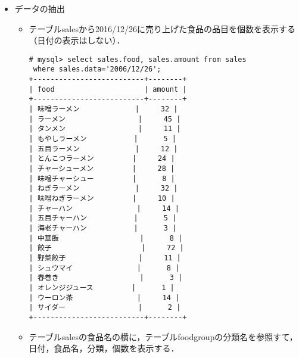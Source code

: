 \documentclass[a4j,titlepage]{jarticle}
\begin{document}
\begin{itemize}
\begin{itemize}
\begin{itemize}
\end{itemize}

\item データの抽出

\begin{itemize}

\item テーブルsalesから2016/12/26に売り上げた食品の品目を個数を表示する（日付の表示はしない）．

\begin{center}
\begin{screen}
\begin{verbatim}
# mysql> select sales.food, sales.amount from sales 
 where sales.data='2006/12/26';
+--------------------------+--------+
| food                     | amount |
+--------------------------+--------+
| 味噌ラーメン             |     32 |
| ラーメン                 |     45 |
| タンメン                 |     11 |
| もやしラーメン           |      5 |
| 五目ラーメン             |     12 |
| とんこつラーメン         |     24 |
| チャーシューメン         |     28 |
| 味噌チャーシュー         |      8 |
| ねぎラーメン             |     32 |
| 味噌ねぎラーメン         |     10 |
| チャーハン               |     14 |
| 五目チャーハン           |      5 |
| 海老チャーハン           |      3 |
| 中華飯                   |      8 |
| 餃子                     |     72 |
| 野菜餃子                 |     11 |
| シュウマイ               |      8 |
| 春巻き                   |      3 |
| オレンジジュース         |      1 |
| ウーロン茶               |     14 |
| サイダー                 |      2 |
+--------------------------+--------+
\end{verbatim}
\end{screen}
\end{center}

\item テーブルsalesの食品名の横に，テーブルfoodgroupの分類名を参照すて，日付，食品名，分類，個数を表示する．


\end{itemize}
\end{itemize}
\end{itemize}
\end{document}
